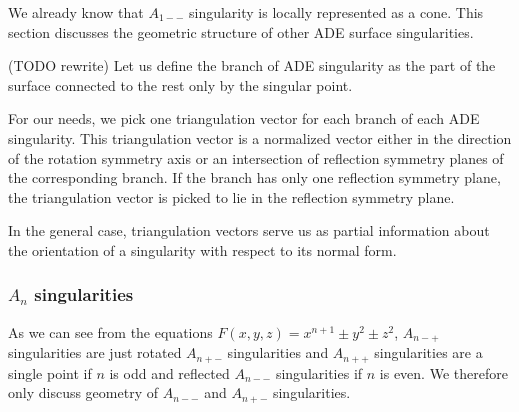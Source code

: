 We already know that $A_{1--}$ singularity is locally represented as a cone.
This section discusses the geometric structure of other ADE surface singularities.

\begin{definition} (TODO rewrite)
    Let us define the branch of ADE singularity as the part of the surface
    connected to the rest only by the singular point.
\end{definition}

For our needs, we pick one triangulation vector for each branch of
each ADE singularity. This triangulation vector is a normalized vector
either in the direction
of the rotation symmetry axis or an intersection of reflection symmetry planes
of the corresponding branch. If the branch has only one reflection symmetry
plane, the triangulation vector is picked to lie in the reflection
symmetry plane.

In the general case, triangulation vectors serve us
as partial information about the orientation of a singularity with 
respect to its normal form.

\subsubsection*{$A_n$ singularities}

As we can see from the equations 
$F(x,y,z)=x^{n+1}\pm y^2\pm z^2$, $A_{n-+}$
singularities are just rotated $A_{n+-}$ singularities and $A_{n++}$ singularities 
are a single point if $n$ is odd and reflected $A_{n--}$ singularities if $n$ is even. 
We therefore only discuss geometry of $A_{n--}$ and $A_{n+-}$ singularities.

